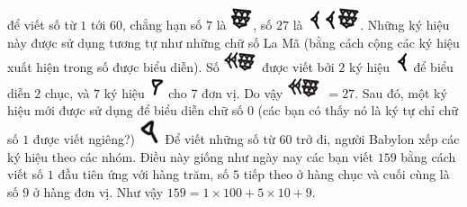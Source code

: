 \begin{multicols}{2}
\begin{table}[H]
\begin{tabular}{|c|c|}
			\hline
		\end{tabular}
		\vspace*{-10pt}
	\end{table}
	để viết số từ $1$ tới $60$, chẳng hạn số $7$ là  \includegraphics[scale=0.7]{17}, số $27$ là  \includegraphics[scale=0.7]{16}\includegraphics[scale=0.7]{16}\includegraphics[scale=0.7]{17}. 	 
	\vskip 0.1cm
	Những ký hiệu này được sử dụng tương tự như những chữ số La Mã (bằng cách cộng các ký hiệu xuất hiện trong số được biểu diễn). Số \includegraphics[scale=0.7]{18} được viết bởi $2$ ký hiệu \includegraphics[scale=0.7]{16} để biểu diễn $2$ chục, và $7$ ký hiệu \includegraphics[scale=0.7]{15}  cho $7$ đơn vị. Do vậy \includegraphics[scale=0.7]{18}  $=27$.
	\vskip 0.1cm
	Sau đó, một ký hiệu mới được sử dụng để biểu diễn chữ số $0$ (các bạn có thấy nó là ký tự chỉ chữ số $1$ được viết ngiêng?)
	\includegraphics[scale=0.65]{15.1}
	\vskip 0.1cm
	Để viết những số từ $60$ trở đi, người Babylon xếp các ký hiệu theo các nhóm. Điều này giống như ngày nay các bạn viết $159$ bằng cách viết số $1$ đầu tiên ứng với hàng trăm, số $5$ tiếp theo ở hàng chục và cuối cùng là số $9$ ở hàng đơn vị. Như vậy $159 = 1 \times 100+ 5 \times 10+ 9$.
	\vskip 0.1cm
	\begin{figure}[H]
		\centering
		\vspace*{-5pt}
		\captionsetup{labelformat= empty, justification=centering}

\end{figure}
\end{multicols}
